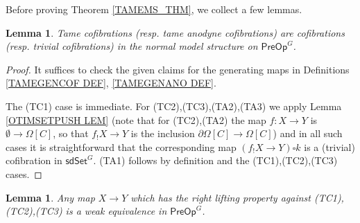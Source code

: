 \documentclass[a4paper,10pt]{article}%
\numberwithin{equation}{section}
\numberwithin{figure}{section}
\newtheorem{lemma}[equation]{Lemma}%
\theoremstyle{definition} %
\newcommand{\1}{\ensuremath{\mathbbm 1}}%
\begin{document}
Before proving Theorem \ref{TAMEMS_THM},
we collect a few lemmas.

\begin{lemma}\label{TAMECOFCOF_LEM}
	Tame cofibrations (resp. tame anodyne cofibrations) are  cofibrations (resp. trivial cofibrations) in the normal model structure on $\mathsf{PreOp}^G$.
\end{lemma}


\begin{proof}
	It suffices to check the given claims for the generating maps
	in Definitions \ref{TAMEGENCOF DEF}, \ref{TAMEGENANO DEF}.
	
	The (TC1) case is immediate.
	For (TC2),(TC3),(TA2),(TA3)
	we apply 
	Lemma \ref{OTIMSETPUSH LEM}
	(note that for (TC2),(TA2)
	the map $f\colon X \to Y$ is $\emptyset \to \Omega[C]$,
	so that $f_!X \to Y$ is the inclusion
	$\partial \Omega[C] \to \Omega[C]$)
	and in all such cases it is 
	straightforward that the 
	corresponding map $(f_!X \to Y) \square k$
	is a (trivial) cofibration in $\mathsf{sdSet}^G$.
	(TA1) follows by definition and the 
	(TC1),(TC2),(TC3) cases.
\end{proof}



\begin{lemma}\label{TAMETRIVFIB LEM}
	Any map $X \to Y$ which has the right lifting property against 
	(TC1),(TC2),(TC3)
	is a weak equivalence in 
	$\mathsf{PreOp}^G$.
\end{lemma}
\end{document}

